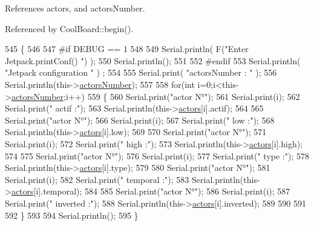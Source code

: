 References actors, and actors\+Number.



Referenced by Cool\+Board\+::begin().


\begin{DoxyCode}
545 \{
546 
547 \textcolor{preprocessor}{#if DEBUG == 1 }
548 
549     Serial.println( F(\textcolor{stringliteral}{"Enter Jetpack.printConf() "}) );
550     Serial.println();
551 
552 \textcolor{preprocessor}{#endif }
553     Serial.println( \textcolor{stringliteral}{"Jetpack configuration "} ) ;
554 
555     Serial.print( \textcolor{stringliteral}{"actorsNumber : "} );
556     Serial.println(this->\hyperlink{classJetpack_a52c86319cb3f7f1ab744a64db18a7ba5}{actorsNumber});
557  
558         \textcolor{keywordflow}{for}(\textcolor{keywordtype}{int} i=0;i<this->\hyperlink{classJetpack_a52c86319cb3f7f1ab744a64db18a7ba5}{actorsNumber};i++)
559     \{   
560         Serial.print(\textcolor{stringliteral}{"actor N°"});
561         Serial.print(i);
562         Serial.print(\textcolor{stringliteral}{" actif :"});
563         Serial.println(this->\hyperlink{classJetpack_a7e16d2f97837f9712a2e6de1c50d99db}{actors}[i].actif);
564 
565         Serial.print(\textcolor{stringliteral}{"actor N°"});
566         Serial.print(i);
567         Serial.print(\textcolor{stringliteral}{" low :"});
568         Serial.println(this->\hyperlink{classJetpack_a7e16d2f97837f9712a2e6de1c50d99db}{actors}[i].low);
569 
570         Serial.print(\textcolor{stringliteral}{"actor N°"});
571         Serial.print(i);
572         Serial.print(\textcolor{stringliteral}{" high :"});
573         Serial.println(this->\hyperlink{classJetpack_a7e16d2f97837f9712a2e6de1c50d99db}{actors}[i].high);
574 
575         Serial.print(\textcolor{stringliteral}{"actor N°"});
576         Serial.print(i);
577         Serial.print(\textcolor{stringliteral}{" type :"});
578         Serial.println(this->\hyperlink{classJetpack_a7e16d2f97837f9712a2e6de1c50d99db}{actors}[i].type);
579         
580         Serial.print(\textcolor{stringliteral}{"actor N°"});
581         Serial.print(i);
582         Serial.print(\textcolor{stringliteral}{" temporal :"});
583         Serial.println(this->\hyperlink{classJetpack_a7e16d2f97837f9712a2e6de1c50d99db}{actors}[i].temporal);
584 
585         Serial.print(\textcolor{stringliteral}{"actor N°"});
586         Serial.print(i);
587         Serial.print(\textcolor{stringliteral}{" inverted :"});
588         Serial.println(this->\hyperlink{classJetpack_a7e16d2f97837f9712a2e6de1c50d99db}{actors}[i].inverted);
589 
590  
591 
592     \}
593 
594     Serial.println();
595 \}
\end{DoxyCode}
